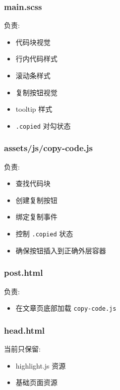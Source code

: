 \documentclass[lang=cn,scheme=chinese,color=blue,device=normal,toc=onecol,math=cm]{elegantbook}
\begin{document}
\subsubsection{main.scss}


负责:\par


\begin{itemize}
\item 代码块视觉
\item 行内代码样式
\item 滚动条样式
\item 复制按钮视觉
\item tooltip 样式
\item \texttt{.copied} 对勾状态
\end{itemize}


\subsubsection{assets/\allowbreak{}js/\allowbreak{}copy-code.js}


负责:\par


\begin{itemize}
\item 查找代码块
\item 创建复制按钮
\item 绑定复制事件
\item 控制 \texttt{.copied} 状态
\item 确保按钮插入到正确外层容器
\end{itemize}


\subsubsection{post.html}


负责:\par


\begin{itemize}
\item 在文章页底部加载 \texttt{copy-code.js}
\end{itemize}


\subsubsection{head.html}


当前只保留:\par


\begin{itemize}
\item highlight.js 资源
\item 基础页面资源
\end{itemize}
\end{document}
